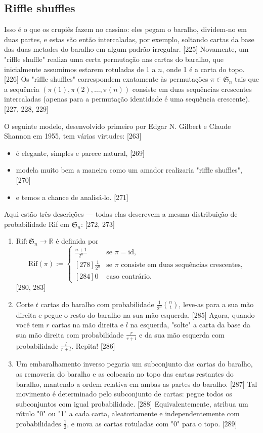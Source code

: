 \documentclass[a4paper]{article}
\begin{document}
\subsection{Riffle shuffles}
Isso é o que os crupiês fazem no cassino: eles pegam o baralho, dividem-no em duas partes, e estas são então intercaladas, por exemplo, soltando cartas da base das duas metades do baralho em algum padrão irregular. [225] Novamente, um "riffle shuffle" realiza uma certa permutação nas cartas do baralho, que inicialmente assumimos estarem rotuladas de 1 a $n$, onde 1 é a carta do topo. [226] Os "riffle shuffles" correspondem exatamente às permutações $\pi \in \mathfrak{S}_n$ tais que a sequência $(\pi(1), \pi(2), \dots, \pi(n))$ consiste em duas sequências crescentes intercaladas (apenas para a permutação identidade é uma sequência crescente). [227, 228, 229]

O seguinte modelo, desenvolvido primeiro por Edgar N. Gilbert e Claude Shannon em 1955, tem várias virtudes: [263]
\begin{itemize}
    \item é elegante, simples e parece natural, [269]
    \item modela muito bem a maneira como um amador realizaria "riffle shuffles", [270]
    \item e temos a chance de analisá-lo. [271]
\end{itemize}
Aqui estão três descrições — todas elas descrevem a mesma distribuição de probabilidade Rif em $\mathfrak{S}_n$: [272, 273]
\begin{enumerate}
    \item $\text{Rif}: \mathfrak{S}_n \to \mathbb{R}$ é definida por
    $$ \text{Rif}(\pi) := \begin{cases} \frac{n+1}{2^n} & \text{se } \pi = \text{id}, \\ [278] \frac{1}{2^n} & \text{se } \pi \text{ consiste em duas sequências crescentes}, \\ [284] 0 & \text{caso contrário}. \end{cases} $$ [280, 283]
    \item Corte $t$ cartas do baralho com probabilidade $\frac{1}{2^n}\binom{n}{t}$, leve-as para a sua mão direita e pegue o resto do baralho na sua mão esquerda. [285] Agora, quando você tem $r$ cartas na mão direita e $l$ na esquerda, "solte" a carta da base da sua mão direita com probabilidade $\frac{r}{r+l}$ e da sua mão esquerda com probabilidade $\frac{l}{r+l}$. Repita! [286]
    \item Um embaralhamento inverso pegaria um subconjunto das cartas do baralho, as removeria do baralho e as colocaria no topo das cartas restantes do baralho, mantendo a ordem relativa em ambas as partes do baralho. [287] Tal movimento é determinado pelo subconjunto de cartas: pegue todos os subconjuntos com igual probabilidade. [288] Equivalentemente, atribua um rótulo "0" ou "1" a cada carta, aleatoriamente e independentemente com probabilidades $\frac{1}{2}$, e mova as cartas rotuladas com "0" para o topo. [289]
\end{enumerate}
\end{document}
